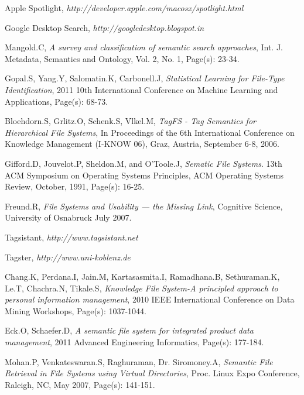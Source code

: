 \begin{thebibliography}{99}


Apple Spotlight, \emph{http://developer.apple.com/macosx/spotlight.html}

Google Desktop Search, \emph{http://googledesktop.blogspot.in}

Mangold.C, \emph{A survey and classification of semantic search approaches}, 
Int. J. Metadata, Semantics and Ontology, Vol. 2, No. 1, Page(s): 23-34.

Gopal.S, Yang.Y, Salomatin.K, Carbonell.J, 
\emph{Statistical Learning for File-Type Identification}, 
2011 10th International Conference on Machine Learning and Applications, Page(s): 68-73.

Bloehdorn.S, Grlitz.O, Schenk.S, Vlkel.M, 
\emph{TagFS - Tag Semantics for Hierarchical File Systems},
In Proceedings of the 6th International Conference on Knowledge Management (I-KNOW 06), Graz, Austria, September 6-8, 2006.

Gifford.D, Jouvelot.P, Sheldon.M, and O’Toole.J, \emph{Sematic File Systems}. 
13th ACM Symposium on Operating Systems Principles, ACM Operating Systems Review, October, 1991, Page(s): 16-25.

Freund.R, 
\emph{File Systems and Usability — the Missing Link},
Cognitive Science, University of Osnabruck July 2007.

Tagsistant, 
\emph{http://www.tagsistant.net}

Tagster, 
\emph{http://www.uni-koblenz.de}

Chang.K, Perdana.I, Jain.M, Kartasasmita.I, Ramadhana.B, Sethuraman.K, Le.T, Chachra.N, Tikale.S, 
\emph{Knowledge File System-A principled approach to personal information management},
2010 IEEE International Conference on Data Mining Workshops, Page(s): 1037-1044.

Eck.O, Schaefer.D, 
\emph{A semantic file system for integrated product data management}, 2011 Advanced Engineering Informatics, Page(s): 177-184.

Mohan.P, Venkateswaran.S, Raghuraman, Dr. Siromoney.A, 
\emph{Semantic File Retrieval in File Systems using Virtual Directories},
Proc. Linux Expo Conference, Raleigh, NC, May 2007, Page(s): 141-151.


\end{thebibliography}
